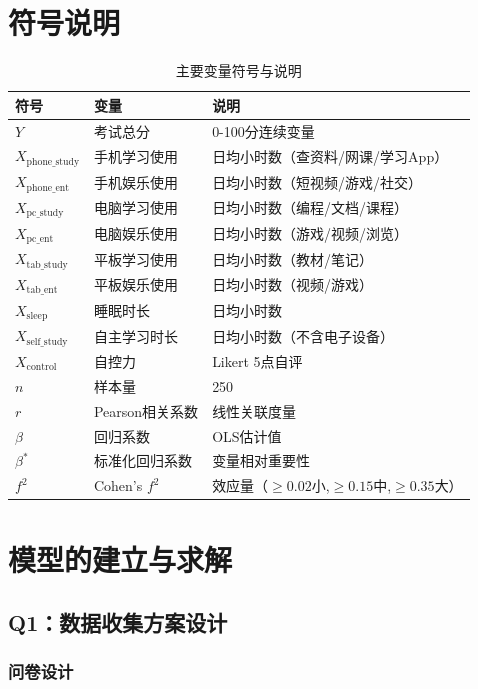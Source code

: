 \documentclass[11pt]{ctexart}
\begin{document}
\section{符号说明}
\begin{table}[H]
\centering
\caption{主要变量符号与说明}
\begin{tabular}{lll}
\toprule
符号 & 变量 & 说明 \\
\midrule
$Y$ & 考试总分 & 0-100分连续变量 \\
$X_{\text{phone\_study}}$ & 手机学习使用 & 日均小时数（查资料/网课/学习App）\\
$X_{\text{phone\_ent}}$ & 手机娱乐使用 & 日均小时数（短视频/游戏/社交）\\
$X_{\text{pc\_study}}$ & 电脑学习使用 & 日均小时数（编程/文档/课程）\\
$X_{\text{pc\_ent}}$ & 电脑娱乐使用 & 日均小时数（游戏/视频/浏览）\\
$X_{\text{tab\_study}}$ & 平板学习使用 & 日均小时数（教材/笔记）\\
$X_{\text{tab\_ent}}$ & 平板娱乐使用 & 日均小时数（视频/游戏）\\
$X_{\text{sleep}}$ & 睡眠时长 & 日均小时数\\
$X_{\text{self\_study}}$ & 自主学习时长 & 日均小时数（不含电子设备）\\
$X_{\text{control}}$ & 自控力 & Likert 5点自评\\
$n$ & 样本量 & 250\\
$r$ & Pearson相关系数 & 线性关联度量\\
$\beta$ & 回归系数 & OLS估计值\\
$\beta^*$ & 标准化回归系数 & 变量相对重要性\\
$f^2$ & Cohen's $f^2$ & 效应量（$\ge0.02$小,$\ge0.15$中,$\ge0.35$大）\\
\bottomrule
\end{tabular}
\end{table}

\section{模型的建立与求解}

\subsection{Q1：数据收集方案设计}

\subsubsection{问卷设计}
\end{document}

